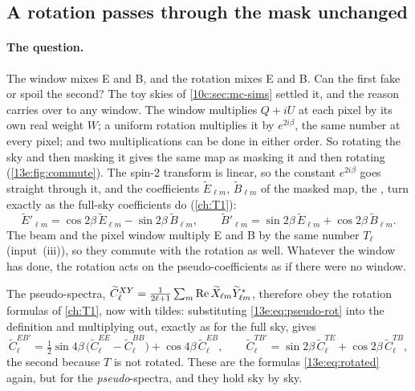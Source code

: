 \subsection{A rotation passes through the mask unchanged}
\label{13e:sec:commute}

\paragraph{The question.} The window mixes E and B, and the rotation mixes E and B. Can the first fake or
spoil the second? The toy skies of \cref{10c:sec:mc-sims} settled it, and the reason carries over to any
window. The window multiplies $Q+iU$ at each pixel by its own real weight $W$; a uniform rotation multiplies it
by $e^{2i\beta}$, the same number at every pixel; and two multiplications can be done in either order. So
rotating the sky and then masking it gives the same map as masking it and then rotating
(\cref{13e:fig:commute}). The spin-2 transform is linear, so the constant $e^{2i\beta}$ goes straight through
it, and the coefficients $\widetilde E_{\ell m}$, $\widetilde B_{\ell m}$ of the masked map, the
, turn exactly as the full-sky coefficients do (\cref{ch:T1}):
\begin{equation}
  \widetilde E'_{\ell m}=\cos2\beta\,\widetilde E_{\ell m}-\sin2\beta\,\widetilde B_{\ell m},\qquad
  \widetilde B'_{\ell m}=\sin2\beta\,\widetilde E_{\ell m}+\cos2\beta\,\widetilde B_{\ell m}.
  \label{13e:eq:pseudo-rot}
\end{equation}
The beam and the pixel window multiply E and B by the same number $T_\ell$ (input~(iii)), so they commute
with the rotation as well. Whatever the window has done, the rotation acts on the pseudo-coefficients as if
there were no window.

The pseudo-spectra, $\widetilde C^{XY}_\ell=\frac1{2\ell+1}\sum_m{\rm Re}\,\widetilde X_{\ell m}\widetilde Y^*_{\ell m}$,
therefore obey the rotation formulas of \cref{ch:T1}, now with tildes: substituting \eqref{13e:eq:pseudo-rot}
into the definition and multiplying out, exactly as for the full sky, gives
\begin{equation}
  \widetilde C^{EB\prime}_\ell=\tfrac12\sin4\beta\,\bigl(\widetilde C^{EE}_\ell-\widetilde C^{BB}_\ell\bigr)+\cos4\beta\,\widetilde C^{EB}_\ell,
  \qquad
  \widetilde C^{TB\prime}_\ell=\sin2\beta\,\widetilde C^{TE}_\ell+\cos2\beta\,\widetilde C^{TB}_\ell ,
  \label{13e:eq:pseudo-eb}
\end{equation}
the second because $T$ is not rotated. These are the formulas \eqref{13e:eq:rotated} again, but for the
\emph{pseudo}-spectra, and they hold sky by sky.

